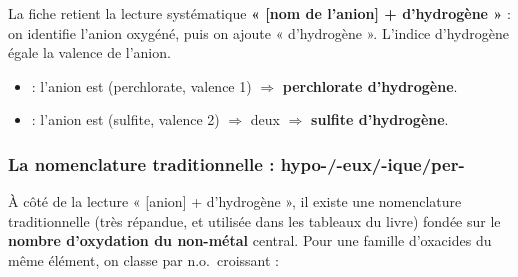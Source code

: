 \documentclass[11pt,a4paper]{article}
\begin{document}
\begin{regle}
La fiche retient la lecture systématique \textbf{« [nom de l'anion] + d'hydrogène »} : on identifie
l'anion oxygéné, puis on ajoute « d'hydrogène ». L'indice d'hydrogène égale la valence de l'anion.
\end{regle}

\begin{exemple}
\begin{itemize}[leftmargin=1.6em,topsep=2pt,itemsep=2pt]
  \item {} : l'anion est  (perchlorate, valence 1) $\Rightarrow$
        \textbf{perchlorate d'hydrogène}.
  \item {} : l'anion est  (sulfite, valence 2) $\Rightarrow$ deux  $\Rightarrow$
        \textbf{sulfite d'hydrogène}.
\end{itemize}
\end{exemple}

\subsubsection{La nomenclature traditionnelle : hypo-/-eux/-ique/per-}

À côté de la lecture « [anion] + d'hydrogène », il existe une nomenclature traditionnelle (très
répandue, et utilisée dans les tableaux du livre) fondée sur le \textbf{nombre d'oxydation du non-métal}
central. Pour une famille d'oxacides du même élément, on classe par n.o.\ croissant :

\begin{center}
\end{center}
\end{document}
